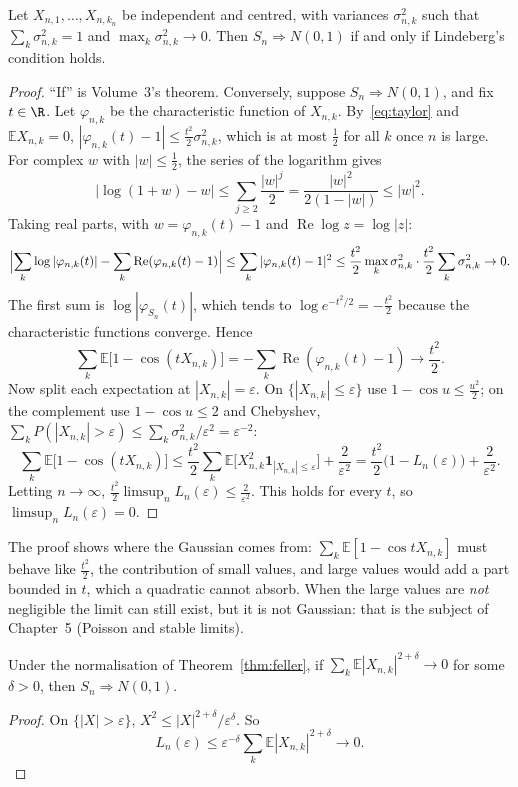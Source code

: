\begin{theorem}\label{thm:feller}
Let $X_{n,1},\dots,X_{n,k_n}$ be independent and centred, with variances $\sigma_{n,k}^2$ such that $\sum_k\sigma_{n,k}^2=1$ and $\max_k\sigma_{n,k}^2\to0$.
Then $S_n\Rightarrow N(0,1)$ if and only if Lindeberg's condition holds.
\end{theorem}
\begin{proof}
``If'' is Volume~3's theorem. Conversely, suppose $S_n\Rightarrow N(0,1)$, and fix $t\in\R$. Let $\varphi_{n,k}$ be the characteristic function of
$X_{n,k}$. By~\eqref{eq:taylor} and $\mathbb EX_{n,k}=0$, $|\varphi_{n,k}(t)-1|\le\frac{t^2}2\sigma_{n,k}^2$, which is at most $\frac12$ for all $k$ once $n$ is
large. For complex $w$ with $|w|\le\frac12$, the series of the logarithm gives
\[
|\log(1+w)-w|\le\sum_{j\ge2}\frac{|w|^j}2=\frac{|w|^2}{2(1-|w|)}\le|w|^2.
\]
Taking real parts, with $w=\varphi_{n,k}(t)-1$ and $\operatorname{Re}\log z=\log|z|$:
\[
\Bigl|\sum_k\log|\varphi_{n,k}(t)|-\sum_k\operatorname{Re}(\varphi_{n,k}(t)-1)\Bigr|\le\sum_k|\varphi_{n,k}(t)-1|^2\le\frac{t^2}2\max_k\sigma_{n,k}^2\cdot\frac{t^2}2\sum_k\sigma_{n,k}^2\to0.
\]
The first sum is $\log|\varphi_{S_n}(t)|$, which tends to $\log e^{-t^2/2}=-\frac{t^2}2$ because the characteristic functions converge. Hence
\[
\sum_k\mathbb E\bigl[1-\cos(tX_{n,k})\bigr]=-\sum_k\operatorname{Re}(\varphi_{n,k}(t)-1)\to\frac{t^2}2.
\]
Now split each expectation at $|X_{n,k}|=\varepsilon$. On $\{|X_{n,k}|\le\varepsilon\}$ use $1-\cos u\le\frac{u^2}2$; on the complement use $1-\cos u\le2$ and
Chebyshev, $\sum_kP(|X_{n,k}|>\varepsilon)\le\sum_k\sigma_{n,k}^2/\varepsilon^2=\varepsilon^{-2}$:
\[
\sum_k\mathbb E\bigl[1-\cos(tX_{n,k})\bigr]\le\frac{t^2}2\sum_k\mathbb E\bigl[X_{n,k}^2\mathbf 1_{|X_{n,k}|\le\varepsilon}\bigr]+\frac2{\varepsilon^2}
=\frac{t^2}2\bigl(1-L_n(\varepsilon)\bigr)+\frac2{\varepsilon^2}.
\]
Letting $n\to\infty$, $\frac{t^2}2\limsup_nL_n(\varepsilon)\le\frac2{\varepsilon^2}$. This holds for every $t$, so $\limsup_nL_n(\varepsilon)=0$.
\end{proof}

The proof shows where the Gaussian comes from: $\sum_k\mathbb E[1-\cos tX_{n,k}]$ must behave like $\frac{t^2}2$, the contribution of small values,
and large values would add a part bounded in $t$, which a quadratic cannot absorb. When the large values are \emph{not} negligible the limit can
still exist, but it is not Gaussian: that is the subject of Chapter~5 (Poisson and stable limits).

\begin{corollary}\label{cor:lyapunov}
Under the normalisation of Theorem~\ref{thm:feller}, if $\sum_k\mathbb E|X_{n,k}|^{2+\delta}\to0$ for some $\delta>0$, then $S_n\Rightarrow N(0,1)$.
\end{corollary}
\begin{proof}
On $\{|X|>\varepsilon\}$, $X^2\le|X|^{2+\delta}/\varepsilon^\delta$. So
\[
L_n(\varepsilon)\le\varepsilon^{-\delta}\sum_k\mathbb E|X_{n,k}|^{2+\delta}\to0.
\]
\end{proof}

